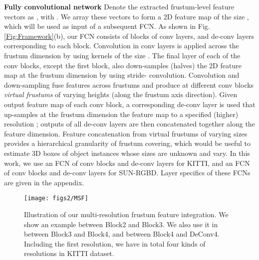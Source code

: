 \documentclass[letterpaper, 10 pt, conference]{ieeeconf}
\begin{document}
\vspace{0.1cm}
\noindent\textbf{Fully convolutional network}
Denote the extracted frustum-level feature vectors as , with . We array these  vectors to form a 2D feature map  of the size , which will be used as input of a subsequent FCN. As shown in Fig.\ref{Fig:Framework}(b), our FCN consists of blocks of conv layers, and de-conv layers corresponding to each block. Convolution in conv layers is applied across the frustum dimension by using kernels of the size . The final layer of each of the conv blocks, except the first block, also down-samples (halves) the 2D feature map at the frustum dimension by using stride- convolution. Convolution and down-sampling fuse features across frustums and produce at different conv blocks \emph{virtual frustums} of varying heights (along the frustum axis direction). Given output feature map of each conv block, a corresponding de-conv layer is used that up-samples at the frustum dimension the feature map to a specified (higher) resolution ; outputs of all de-conv layers are then concatenated together along the feature dimension. Feature concatenation from virtual frustums of varying sizes provides a hierarchical granularity of frustum covering, which would be useful to estimate 3D boxes of object instances whose sizes are unknown and vary. In this work, we use an FCN of  conv blocks and  de-conv layers for KITTI, and an FCN of  conv blocks and  de-conv layers for SUN-RGBD. Layer specifics of these FCNs are given in the appendix.

\begin{figure}
	\begin{center}
	\texttt{[image: figs2/MSF]}
	\caption[]{Illustration of our multi-resolution frustum feature integration. We show an example between Block2 and Block3. We also use it in between Block3 and Block4, and between Block4 and DeConv4. Including the first resolution, we have in total four kinds of resolutions in KITTI dataset.}
	\label{Fig:MSF}
	\end{center}
	\vspace{-0.5cm}
\end{figure}
\end{document}
